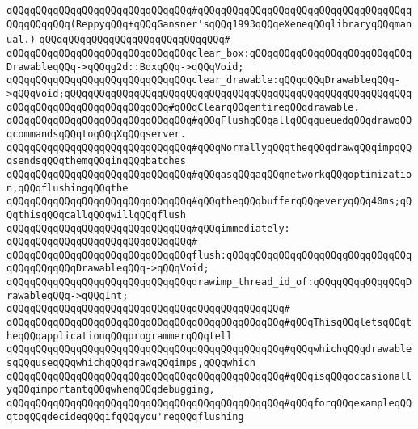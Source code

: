 \verb|qQQqqQQqqQQqqQQqqQQqqQQqqQQqqQQq#qQQqqQQqqQQqqQQqqQQqqQQqqQQqqQQqqQQqqQQqqQQqqQQq(ReppyqQQq+qQQqGansner'sqQQq1993qQQqeXeneqQQqlibraryqQQqmanual.)|\newline
\verb|qQQqqQQqqQQqqQQqqQQqqQQqqQQqqQQq#|\newline
\verb|qQQqqQQqqQQqqQQqqQQqqQQqqQQqqQQqclear_box:qQQqqQQqqQQqqQQqqQQqqQQqqQQqDrawableqQQq->qQQqg2d::BoxqQQq->qQQqVoid;|\newline
\verb|qQQqqQQqqQQqqQQqqQQqqQQqqQQqqQQqclear_drawable:qQQqqQQqDrawableqQQq->qQQqVoid;qQQqqQQqqQQqqQQqqQQqqQQqqQQqqQQqqQQqqQQqqQQqqQQqqQQqqQQqqQQqqQQqqQQqqQQqqQQqqQQqqQQqqQQq#qQQqClearqQQqentireqQQqdrawable.|\newline
\newline
\newline
\verb|qQQqqQQqqQQqqQQqqQQqqQQqqQQqqQQq#qQQqFlushqQQqallqQQqqueuedqQQqdrawqQQqcommandsqQQqtoqQQqXqQQqserver.|\newline
\verb|qQQqqQQqqQQqqQQqqQQqqQQqqQQqqQQq#qQQqNormallyqQQqtheqQQqdrawqQQqimpqQQqsendsqQQqthemqQQqinqQQqbatches|\newline
\verb|qQQqqQQqqQQqqQQqqQQqqQQqqQQqqQQq#qQQqasqQQqaqQQqnetworkqQQqoptimization,qQQqflushingqQQqthe|\newline
\verb|qQQqqQQqqQQqqQQqqQQqqQQqqQQqqQQq#qQQqtheqQQqbufferqQQqeveryqQQq40ms;qQQqthisqQQqcallqQQqwillqQQqflush|\newline
\verb|qQQqqQQqqQQqqQQqqQQqqQQqqQQqqQQq#qQQqimmediately:|\newline
\verb|qQQqqQQqqQQqqQQqqQQqqQQqqQQqqQQq#|\newline
\verb|qQQqqQQqqQQqqQQqqQQqqQQqqQQqqQQqflush:qQQqqQQqqQQqqQQqqQQqqQQqqQQqqQQqqQQqqQQqqQQqDrawableqQQq->qQQqVoid;|\newline
\newline
\verb|qQQqqQQqqQQqqQQqqQQqqQQqqQQqqQQqdrawimp_thread_id_of:qQQqqQQqqQQqqQQqDrawableqQQq->qQQqInt;|\newline
\verb|qQQqqQQqqQQqqQQqqQQqqQQqqQQqqQQqqQQqqQQqqQQqqQQq#|\newline
\verb|qQQqqQQqqQQqqQQqqQQqqQQqqQQqqQQqqQQqqQQqqQQqqQQq#qQQqThisqQQqletsqQQqtheqQQqapplicationqQQqprogrammerqQQqtell|\newline
\verb|qQQqqQQqqQQqqQQqqQQqqQQqqQQqqQQqqQQqqQQqqQQqqQQq#qQQqwhichqQQqdrawablesqQQquseqQQqwhichqQQqdrawqQQqimps,qQQqwhich|\newline
\verb|qQQqqQQqqQQqqQQqqQQqqQQqqQQqqQQqqQQqqQQqqQQqqQQq#qQQqisqQQqoccasionallyqQQqimportantqQQqwhenqQQqdebugging,|\newline
\verb|qQQqqQQqqQQqqQQqqQQqqQQqqQQqqQQqqQQqqQQqqQQqqQQq#qQQqforqQQqexampleqQQqtoqQQqdecideqQQqifqQQqyou'reqQQqflushing|\newline
